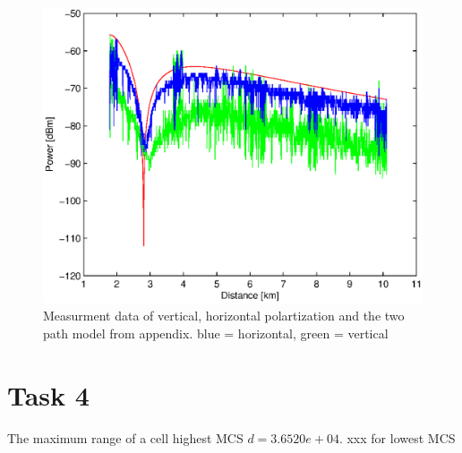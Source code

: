 \documentclass{article}
\begin{document}
\begin{figure}[H]
  \centering
      \includegraphics[width=1.0\textwidth]{task3.eps}
  \caption{Measurment data of vertical, horizontal polartization and the two path model from appendix. blue = horizontal, green = vertical}
\end{figure}


\section {Task 4}

The maximum range of a cell highest MCS $d = 3.6520e+04 $. xxx for lowest MCS
\end{document}
